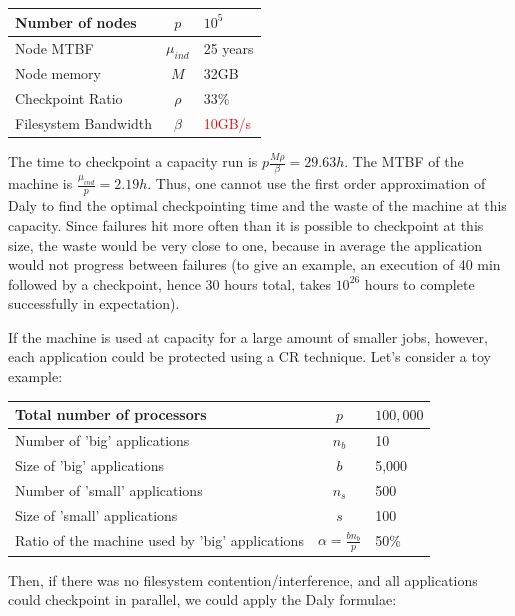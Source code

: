 \documentclass{article}
\begin{document}
\begin{center}
\begin{tabular}{l|c|l}
  Number of nodes & $p$             & $10^5$ \\\hline
  Node MTBF           & $\mu_{ind}$ & 25 years\\\hline
  Node memory      & $M$             & 32GB\\\hline
  Checkpoint Ratio & $\rho$         & 33\%\\\hline
  Filesystem Bandwidth & $\beta$ & \textcolor{red}{10GB/s}\\
\end{tabular}
\end{center}

The time to checkpoint a capacity run is $p\frac{M \rho}{\beta} = 29.63h$. The MTBF of the machine is $\frac{\mu_{ind}}{p} = 2.19h$. Thus, one cannot use the first order approximation of Daly to find the optimal checkpointing time and the waste of the machine at this capacity. Since failures hit more often than it is possible to checkpoint at this size, the waste would be very close to one, because in average the application would not progress between failures (to give an example, an execution of 40 min
followed by a checkpoint, hence 30 hours total, takes $10^{26}$ hours to complete successfully in expectation).

If the machine is used at capacity for a large amount of smaller jobs, however, each application could be protected using a CR technique. Let's consider a toy example:

\begin{center}
\begin{tabular}{lcl}
  Total number of processors & $p$ & $100,000$\\\hline
  Number of 'big' applications & $n_{b}$ & 10\\\hline
  Size of 'big' applications & $b$ & 5,000\\\hline
  Number of 'small' applications & $n_{s}$ & 500\\\hline
  Size of 'small' applications & $s$ & 100\\\hline
  Ratio of the machine used by 'big' applications & $\alpha = \frac{b n_{b}}{p} $ & 50\%\\
\end{tabular}
\end{center}

Then, if there was no filesystem contention/interference, and all applications could checkpoint in parallel, we could apply the Daly formulae:
\end{document}
